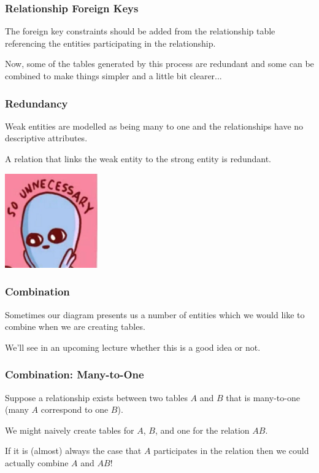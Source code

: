 \begin{frame}
\frametitle{Relationship Foreign Keys}

The foreign key constraints should be added from the relationship table referencing the entities participating in the relationship. 

Now, some of the tables generated by this process are redundant and some can be combined to make things simpler and a little bit clearer...


\end{frame}



\begin{frame}
\frametitle{Redundancy}

Weak entities are modelled as being many to one and the relationships have no descriptive attributes. 


A relation that links the weak entity to the strong entity is redundant. 

\begin{center}
	\includegraphics[width=0.3\textwidth]{images/unnecessary.jpg}
\end{center}

\end{frame}



\begin{frame}
\frametitle{Combination}

Sometimes our diagram presents us a number of entities which we would like to combine when we are creating tables.

We'll see in an upcoming lecture whether this is a good idea or not.

\end{frame}



\begin{frame}
\frametitle{Combination: Many-to-One}

Suppose a relationship exists between two tables $A$ and $B$ that is many-to-one (many $A$ correspond to one $B$).

We might naively create tables for $A$, $B$, and one for the relation $AB$. 

If it is (almost) always the case that $A$ participates in the relation then we could actually combine $A$ and $AB$! 

\end{frame}



